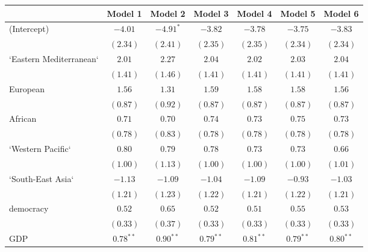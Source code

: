
\begin{table}[!h]
\begin{center}
\begin{tabular}{l c c c c c c }
\toprule
 & Model 1 & Model 2 & Model 3 & Model 4 & Model 5 & Model 6 \\
\midrule
(Intercept)             & $-4.01$      & $-4.91^{*}$  & $-3.82$      & $-3.78$      & $-3.75$      & $-3.83$      \\
                        & $(2.34)$     & $(2.41)$     & $(2.35)$     & $(2.35)$     & $(2.34)$     & $(2.34)$     \\
`Eastern Mediterranean` & $2.01$       & $2.27$       & $2.04$       & $2.02$       & $2.03$       & $2.04$       \\
                        & $(1.41)$     & $(1.46)$     & $(1.41)$     & $(1.41)$     & $(1.41)$     & $(1.41)$     \\
European                & $1.56$       & $1.31$       & $1.59$       & $1.58$       & $1.58$       & $1.56$       \\
                        & $(0.87)$     & $(0.92)$     & $(0.87)$     & $(0.87)$     & $(0.87)$     & $(0.87)$     \\
African                 & $0.71$       & $0.70$       & $0.74$       & $0.73$       & $0.75$       & $0.73$       \\
                        & $(0.78)$     & $(0.83)$     & $(0.78)$     & $(0.78)$     & $(0.78)$     & $(0.78)$     \\
`Western Pacific`       & $0.80$       & $0.79$       & $0.78$       & $0.73$       & $0.73$       & $0.66$       \\
                        & $(1.00)$     & $(1.13)$     & $(1.00)$     & $(1.00)$     & $(1.00)$     & $(1.01)$     \\
`South-East Asia`       & $-1.13$      & $-1.09$      & $-1.04$      & $-1.09$      & $-0.93$      & $-1.03$      \\
                        & $(1.21)$     & $(1.23)$     & $(1.22)$     & $(1.21)$     & $(1.22)$     & $(1.21)$     \\
democracy               & $0.52$       & $0.65$       & $0.52$       & $0.51$       & $0.55$       & $0.53$       \\
                        & $(0.33)$     & $(0.37)$     & $(0.33)$     & $(0.33)$     & $(0.33)$     & $(0.33)$     \\
GDP                     & $0.78^{**}$  & $0.90^{**}$  & $0.79^{**}$  & $0.81^{**}$  & $0.79^{**}$  & $0.80^{**}$  \\

\end{tabular}
\end{center}
\end{table}
